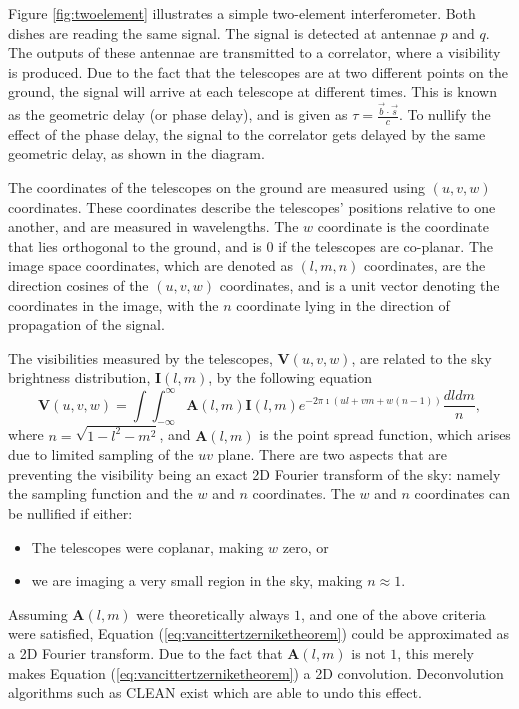 \documentclass{article}
\begin{document}
 Figure \ref{fig:twoelement} illustrates a simple two-element interferometer. Both dishes are reading the same signal. The signal is detected at antennae $p$ and $q$. The outputs of these antennae are transmitted to a correlator, where a visibility is produced. Due to the fact that the telescopes are at two different points on the ground, the signal will arrive at each telescope at different times. This is known as the geometric delay (or phase delay), and is given as $\tau = \frac{\Vec{b} \cdot \Vec{s}}{c}$. To nullify the effect of the phase delay, the signal to the correlator gets delayed by the same geometric delay, as shown in the diagram.

The coordinates of the telescopes on the ground are measured using $(u, v, w)$ coordinates. These coordinates describe the telescopes' positions relative to one another, and are measured in wavelengths. The $w$ coordinate is the coordinate that lies orthogonal to the ground, and is $0$ if the telescopes are co-planar. The image space coordinates, which are denoted as $(l, m, n)$ coordinates, are the direction cosines of the $(u, v, w)$ coordinates, and is a unit vector denoting the coordinates in the image, with the $n$ coordinate lying in the direction of propagation of the signal. 

The visibilities measured by the telescopes, $\mathbf{V}(u, v, w)$, are related to the sky brightness distribution, $\mathbf{I}(l, m)$, by the following equation \citep{thompson2008}
\begin{equation}
\label{eq:vancittertzerniketheorem}
    \mathbf{V}(u, v, w) = \int \int _{-\infty}^\infty \mathbf{A}(l, m) \mathbf{I}(l, m) e^{-2 \pi \imath (ul + vm + w(n - 1))} \frac{dldm}{n} ,
\end{equation}
where $n = \sqrt{1 - l^2 - m^2}$, and $\mathbf{A}(l, m)$ is the point spread function, which arises due to limited sampling of the $uv$ plane. There are two aspects that are preventing the visibility being an exact 2D Fourier transform of the sky: namely the sampling function and the $w$ and $n$ coordinates. The $w$ and $n$ coordinates can be nullified if either:
\begin{itemize}
    \item The telescopes were coplanar, making $w$ zero, or
    \item we are imaging a very small region in the sky, making $n \approx 1$. 
\end{itemize}
Assuming $\mathbf{A}(l, m)$ were theoretically always $1$, and one of the above criteria were satisfied, Equation (\ref{eq:vancittertzerniketheorem}) could be approximated as a 2D Fourier transform. Due to the fact that $\mathbf{A}(l, m)$ is not $1$, this merely makes Equation (\ref{eq:vancittertzerniketheorem}) a 2D convolution. Deconvolution algorithms such as CLEAN\citep{hogbom1974aperture} exist which are able to undo this effect. 
\end{document}
